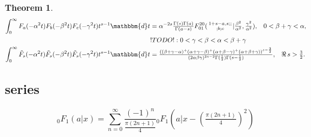 \documentclass[12pt]{article}
\newcommand{\dd}[0] {\mathbbm{d}}
\numberwithin{equation}{section}
\newtheorem{theorem}{Theorem}[section]
\newcommand{\Head}[3] {{}_{#1}{#2}_{#3}}
\newcommand{\ArgS}[3] {( \begin{smallmatrix} #1 \\ #2 \end{smallmatrix} | {#3})}
\newcommand{\HypJ}[2] {F_{#1}(#2)}
\newcommand{\HypJreg}[2] {{\tilde{F}}_{#1}(#2)}
\newcommand{\TwoHead}[3] {{#1}_{#3}^{#2}}
\newcommand{\HypFfourS}[6] {\TwoHead{F}{2 0}{0 1} \ArgS{{#1},{#2};;}{;{#3};{#4}}{{#5},{#6}}}
\begin{document}
\begin{theorem}
\begin{align*}
\int_{0}^{\infty} \HypJ{a}{-\alpha^2 t} \HypJ{b}{-\beta^2 t} \HypJ{c}{-\gamma^2 t} t^{s-1} \dd t &= 
\alpha^{-2s} \tfrac{\Gamma(s) \Gamma(a)}{\Gamma(a-s)} \HypFfourS{1+s-a}{s}{b}{c}{\tfrac{\beta^2}{\alpha^2}} {\tfrac{\gamma^2}{\alpha^2}} \text{,} \quad 0 < \beta + \gamma < \alpha\text{,}\\
& !TODO! : 0 < \gamma < \beta < \alpha < \beta + \gamma\\
\int_{0}^{\infty} \HypJreg{s}{-\alpha^2 t} \HypJreg{s}{-\beta^2 t} \HypJreg{s}{-\gamma^2 t} t^{s-1} \dd t &= 
\tfrac{((\beta+\gamma-\alpha)^+(\alpha+\gamma-\beta)^+(\alpha+\beta-\gamma)^+ (\alpha+\beta+\gamma))^{s-\frac32}}{(2\alpha \beta \gamma)^{2s-2} \Gamma(\frac12) \Gamma(s-\frac12)}\text{,}  \quad \Re \, s > \tfrac32\text{.}
\end{align*}
\end{theorem}

\subsection{series}
\begin{equation*}
\Head{0}{F}{1}(a|x) = \sum_{n=0}^{\infty} \frac{(-1)^n}{\tfrac{\pi(2n+1)}{4}} \Head{0}{F}{1}(a|x-(\tfrac{\pi(2n+1)}{4})^2)
\end{equation*}
\end{document}
